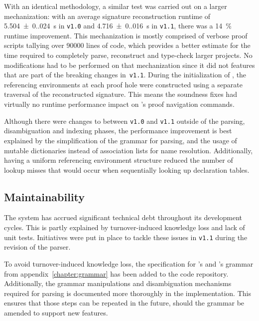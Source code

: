 With an identical methodology, a similar test was carried out on a larger mechanization: with an average signature reconstruction runtime of \SI{5.504(0.024)}{\second} in \texttt{v1.0} and \SI{4.716(0.016)}{\second} in \texttt{v1.1}, there was a \SI{14}{\percent} runtime improvement.
This mechanization is mostly comprised of verbose \Harpoon proof scripts tallying over \num{90000} lines of code, which provides a better estimate for the time required to completely parse, reconstruct and type-check larger projects.
No modifications had to be performed on that mechanization since it did not features that are part of the breaking changes in~\texttt{v1.1}.
During the initialization of \Harpoon, the referencing environments at each proof hole were constructed using a separate traversal of the reconstructed \Beluga signature.
This means the soundness fixes had virtually no runtime performance impact on \Harpoon's proof navigation commands.

Although there were changes to \Beluga between \texttt{v1.0} and \texttt{v1.1} outside of the parsing, disambiguation and indexing phases, the performance improvement is best explained by the simplification of the grammar for parsing, and the usage of mutable dictionaries instead of association lists for name resolution.
Additionally, having a uniform referencing environment structure reduced the number of lookup misses that would occur when sequentially looking up declaration tables.

\subsection*{Maintainability}


The \Beluga system has accrued significant technical debt throughout its development cycles.
This is partly explained by turnover-induced knowledge loss and lack of unit tests.
Initiatives were put in place to tackle these issues in \texttt{v1.1} during the revision of the parser.


To avoid turnover-induced knowledge loss, the specification for \Beluga's and \Harpoon's grammar from appendix~\ref{chapter:grammar} has been added to the code repository.
Additionally, the grammar manipulations and disambiguation mechanisms required for parsing is documented more thoroughly in the implementation.
This ensures that those steps can be repeated in the future, should the grammar be amended to support new features.


